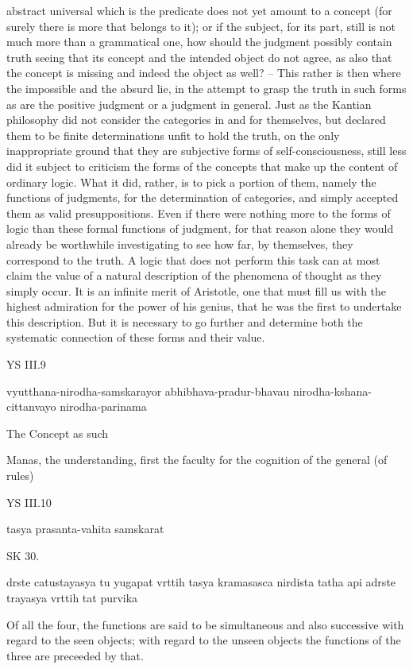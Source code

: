 abstract universal which is the predicate does not yet amount to a concept
(for surely there is more that belongs to it); or if the subject, for its part,
still is not much more than a grammatical one, how should the judgment
possibly contain truth seeing that its concept and the intended object do
not agree, as also that the concept is missing and indeed the object as well? –
This rather is then where the impossible and the absurd lie, in the attempt
to grasp the truth in such forms as are the positive judgment or a judgment
in general. Just as the Kantian philosophy did not consider the categories
in and for themselves, but declared them to be finite determinations unfit
to hold the truth, on the only inappropriate ground that they are subjective
forms of self-consciousness, still less did it subject to criticism the forms
of the concepts that make up the content of ordinary logic. What it did,
rather, is to pick a portion of them, namely the functions of judgments,
for the determination of categories, and simply accepted them as valid
presuppositions. Even if there were nothing more to the forms of logic
than these formal functions of judgment, for that reason alone they would
already be worthwhile investigating to see how far, by themselves, they
correspond to the truth. A logic that does not perform this task can at most
claim the value of a natural description of the phenomena of thought as
they simply occur. It is an infinite merit of Aristotle, one that must fill us
with the highest admiration for the power of his genius, that he was the
first to undertake this description. But it is necessary to go further and
determine both the systematic connection of these forms and their value.

YS III.9

    vyutthana-nirodha-samskarayor abhibhava-pradur-bhavau nirodha-kshana-cittanvayo nirodha-parinama

    The Concept as such

    Manas, the understanding, first the faculty for the cognition of the general (of rules)

YS III.10

    tasya prasanta-vahita samskarat

SK 30.

drste catustayasya tu yugapat vrttih tasya kramasasca nirdista
tatha api adrste trayasya vrttih tat purvika

Of all the four, the functions are said to be simultaneous and also successive
with regard to the seen objects;
with regard to the unseen objects
the functions of the three are preceeded by that.

